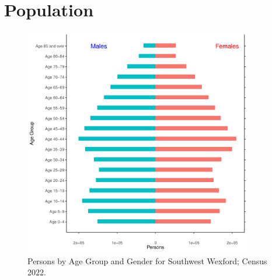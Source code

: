 \documentclass{article}
\begin{document}
\pagebreak

\section{Population} 
\label{sect:Pop}

\begin{figure}[h]
	\centering
	\includegraphics[width = 100mm]{../figures/PyramidPlot.pdf}
	\caption{Persons by Age Group and Gender for Southwest Wexford; Census 2022.}
	\label{fig:2ae19629-1a6a-13a3-e055-000000000001}
	\end{figure}
\end{document}
